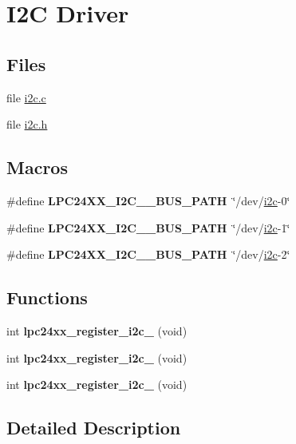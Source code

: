 \hypertarget{group__RTEMSBSPsARMLPC24XXI2C}{}\section{I2C Driver}
\label{group__RTEMSBSPsARMLPC24XXI2C}
\subsection*{Files}
\begin{DoxyCompactItemize}
\item 
file \mbox{\hyperlink{arm_2lpc24xx_2i2c_2i2c_8c}{i2c.\+c}}
\item 
file \mbox{\hyperlink{bsps_2arm_2lpc24xx_2include_2bsp_2i2c_8h}{i2c.\+h}}
\end{DoxyCompactItemize}
\subsection*{Macros}
\begin{DoxyCompactItemize}
\item 
\mbox{\label{group__RTEMSBSPsARMLPC24XXI2C_ga7a25f06e660ad87631fa6603715ac7e2}} 
\#define {\bfseries L\+P\+C24\+X\+X\+\_\+\+I2\+C\+\_\+\_\+\+B\+U\+S\+\_\+\+P\+A\+TH}~\char`\"{}/dev/\mbox{\hyperlink{structi2c}{i2c}}-\/0\char`\"{}
\item 
\mbox{\label{group__RTEMSBSPsARMLPC24XXI2C_ga30e7da6cec95521a7c75897914762ea9}} 
\#define {\bfseries L\+P\+C24\+X\+X\+\_\+\+I2\+C\+\_\+\_\+\+B\+U\+S\+\_\+\+P\+A\+TH}~\char`\"{}/dev/\mbox{\hyperlink{structi2c}{i2c}}-\/1\char`\"{}
\item 
\mbox{\label{group__RTEMSBSPsARMLPC24XXI2C_gae0dbbf9a182bfcfeeb4474d6e6a57e95}} 
\#define {\bfseries L\+P\+C24\+X\+X\+\_\+\+I2\+C\+\_\+\_\+\+B\+U\+S\+\_\+\+P\+A\+TH}~\char`\"{}/dev/\mbox{\hyperlink{structi2c}{i2c}}-\/2\char`\"{}
\end{DoxyCompactItemize}
\subsection*{Functions}
\begin{DoxyCompactItemize}
\item 
\mbox{\label{group__RTEMSBSPsARMLPC24XXI2C_ga4159c5172ec740c3c73492102e7384cf}} 
int {\bfseries lpc24xx\+\_\+register\+\_\+i2c\+\_} (void)
\item 
\mbox{\label{group__RTEMSBSPsARMLPC24XXI2C_gaadb5d0c14770a121666d19fcfd144503}} 
int {\bfseries lpc24xx\+\_\+register\+\_\+i2c\+\_} (void)
\item 
\mbox{\label{group__RTEMSBSPsARMLPC24XXI2C_ga07f225d0b75a0bb5ebd62ac34fa5fb4d}} 
int {\bfseries lpc24xx\+\_\+register\+\_\+i2c\+\_} (void)
\end{DoxyCompactItemize}


\subsection{Detailed Description}
